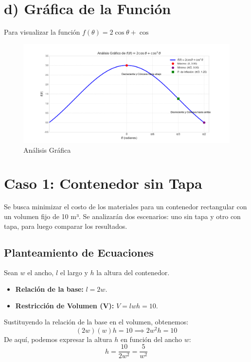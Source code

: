 \documentclass[12pt, letterpaper]{article}
\begin{document}
\section*{d) Gráfica de la Función}
Para visualizar la función $f(\theta) = 2\cos\theta + \cos$

\begin{figure}[h!]
    \centering
    \includegraphics[width=1\textwidth]{Figure_4.png}
    \caption{Análisis Gráfica}
    \label{fig:Figure_2}
\end{figure}

\section*{Caso 1: Contenedor sin Tapa}
Se busca minimizar el costo de los materiales para un contenedor rectangular con un volumen fijo de 10 m³. Se analizarán dos escenarios: uno sin tapa y otro con tapa, para luego comparar los resultados.



\subsection*{Planteamiento de Ecuaciones}
Sean $w$ el ancho, $l$ el largo y $h$ la altura del contenedor.
\begin{itemize}
    \item \textbf{Relación de la base:} $l = 2w$.
    \item \textbf{Restricción de Volumen (V):} $V = lwh = 10$.
\end{itemize}
Sustituyendo la relación de la base en el volumen, obtenemos:
$$ (2w)(w)h = 10 \implies 2w^2h = 10 $$
De aquí, podemos expresar la altura $h$ en función del ancho $w$:
$$ h = \frac{10}{2w^2} = \frac{5}{w^2} $$
\end{document}
